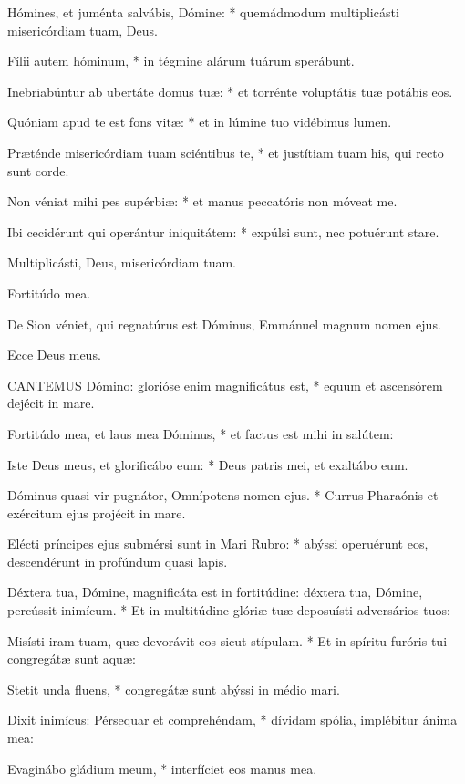 Hómines, et juménta salvábis, Dómine: * quemádmodum multiplicásti misericórdiam tuam, Deus.

Fílii autem hóminum, * in tégmine alárum tuárum sperábunt.

Inebriabúntur ab ubertáte domus tuæ: * et torrénte voluptátis tuæ potábis eos.

Quóniam apud te est fons vitæ: * et in lúmine tuo vidébimus lumen.

Præténde misericórdiam tuam sciéntibus te, * et justítiam tuam his, qui recto sunt corde.

Non véniat mihi pes supérbiæ: * et manus peccatóris non móveat me.

Ibi cecidérunt qui operántur iniquitátem: * expúlsi sunt, nec potuérunt stare.

 Multiplicásti, Deus, misericórdiam tuam.

 Fortitúdo mea.

  De Sion véniet, qui regnatúrus est Dóminus, Emmánuel magnum nomen ejus.

 Ecce Deus meus.


\lettrine[lines=2]{C}{ANTEMUS} Dómino: glorióse enim magnificátus est, * equum et ascensórem dejécit in mare.

Fortitúdo mea, et laus mea Dóminus, * et factus est mihi in salútem:

Iste Deus meus, et glorificábo eum: * Deus patris mei, et exaltábo eum.

Dóminus quasi vir pugnátor, Omnípotens nomen ejus. * Currus Pharaónis et exércitum ejus projécit in mare.

Elécti príncipes ejus submérsi sunt in Mari Rubro: * abýssi operuérunt eos, descendérunt in profúndum quasi lapis.

Déxtera tua, Dómine, magnificáta est in fortitúdine: déxtera tua, Dómine, percússit inimícum. * Et in multitúdine glóriæ tuæ deposuísti adversários tuos:

Misísti iram tuam, quæ devorávit eos sicut stípulam. * Et in spíritu furóris tui congregátæ sunt aquæ:

Stetit unda fluens, * congregátæ sunt abýssi in médio mari.

Dixit inimícus: Pérsequar et comprehéndam, * dívidam spólia, implébitur ánima mea:

Evaginábo gládium meum, * interfíciet eos manus mea.

